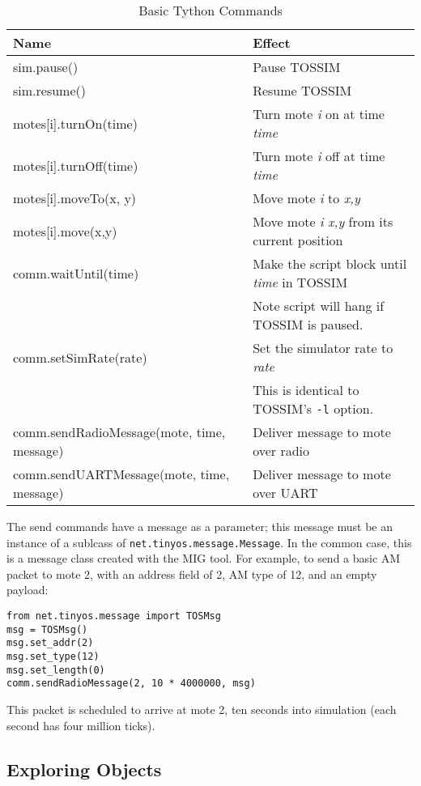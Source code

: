 \documentclass[10pt]{article}
\newcommand{\name}{{Tython}\xspace}
\begin{document}
\begin{table}

\centering

\begin{tabular}{|l|l|}\hline
Name & Effect \\ \hline
sim.pause()  & Pause TOSSIM\\
sim.resume() & Resume TOSSIM\\
motes[i].turnOn(time)  & Turn mote {\it i} on at time {\it time}\\
motes[i].turnOff(time) & Turn mote {\it i} off at time {\it time}\\
motes[i].moveTo(x, y)  & Move mote {\it i} to {\it x,y}\\
motes[i].move(x,y)     & Move mote {\it i} {\it x,y} from its current position\\
comm.waitUntil(time)   & Make the script block until {\it time} in TOSSIM\\
& Note script will hang if TOSSIM is paused.\\
comm.setSimRate(rate)  & Set the simulator rate to {\it rate}\\
                       & This is identical to TOSSIM's {\tt -l} option.\\
comm.sendRadioMessage(mote, time, message) & Deliver message to mote over radio\\
comm.sendUARTMessage(mote, time, message)  & Deliver message to mote over UART\\ \hline
\end{tabular}
\caption{Basic \name Commands}
\label{table:basic_commands}
\end{table}


The send commands have a message as a parameter; this message must be an
instance of a sublcass of {\tt net.tinyos.message.Message}. In the common
case, this is a message class created with the MIG tool. For example, to
send a basic AM packet to mote 2, with an address field of 2, AM type of 12, 
and an empty payload:

\begin{verbatim}
from net.tinyos.message import TOSMsg
msg = TOSMsg()
msg.set_addr(2)
msg.set_type(12)
msg.set_length(0)
comm.sendRadioMessage(2, 10 * 4000000, msg)
\end{verbatim}

This packet is scheduled to arrive at mote 2, ten seconds into
simulation (each second has four million ticks).


\subsection{Exploring Objects}
\end{document}
